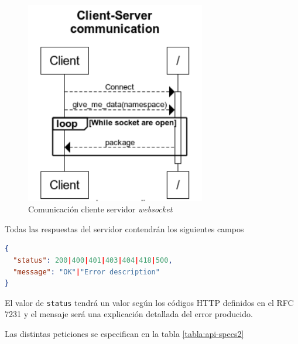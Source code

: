 \begin{figure}
	\centering
	\includegraphics[width=0.7\textwidth]{img/ws-secuence.png}
	\caption{Comunicación cliente servidor \textit{websocket}}
	\label{fig:ws-secuence}
\end{figure}

Todas las respuestas del servidor contendrán los siguientes campos
\begin{lstlisting}[language=JSON]
{
  "status": 200|400|401|403|404|418|500,
  "message": "OK"|"Error description"
}
\end{lstlisting}

El valor de \texttt{status} tendrá un valor según los códigos HTTP definidos en el RFC 7231 y el mensaje será una explicación detallada del error producido.

Las distintas peticiones se especifican en la tabla \ref{tabla:api-specs2}
%			
%			

